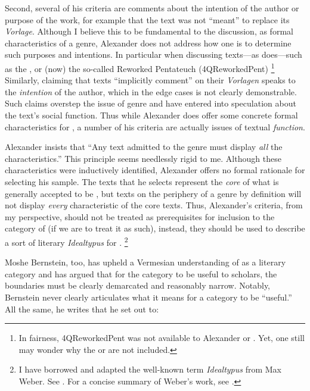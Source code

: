 Second, several of his criteria are comments about the intention of the author or purpose of the work, for example that the \rwb text was not ``meant'' to replace its \emph{Vorlage}. Although I believe this to be fundamental to the discussion, as formal characteristics of a genre, Alexander does not address how one is to determine such purposes and intentions.  In particular when discussing texts---as \vermes does---such as the \pTarg, or (now) the so-called Reworked Pentateuch (4QReworkedPent)%
    \footnote{In fairness, 4QReworkedPent was not available to Alexander or \vermes. Yet, one still may wonder why   the \lxx or \sampent are not included.}
Similarly, claiming that \rwb texts ``implicitly comment'' on their \emph{Vorlagen} speaks to the \emph{intention} of the author, which in the edge cases is not clearly demonstrable. Such claims overstep the issue of genre and have entered into speculation about the text's social function. Thus while Alexander does offer some concrete formal characteristics for \rwb, a number of his criteria are actually issues of textual \emph{function}.

Alexander insists that ``Any text admitted to the genre must display \emph{all} the characteristics.''%
    \autocite[119 n. 11]{alexander_carson-williamson1988}
This principle seems needlessly rigid to me. Although these characteristics were inductively identified,  Alexander offers no formal rationale for selecting his sample. The texts that he selects represent the \emph{core} of what is generally accepted to be \rwb, but texts on the periphery of a genre by definition will not display \emph{every} characteristic of the core texts. Thus, Alexander's criteria, from my perspective, should not be treated as prerequisites for inclusion to the category of \rwb (if we are to treat it as such), instead, they should be used to describe a sort of literary \emph{Idealtypus} for \rwb.%
    \footnote{I have borrowed and adapted the well-known term \emph{Idealtypus} from Max Weber. See 
        \cite{weber1978}. For a concise summary of Weber's work, see 
        \cite[12--16]{smith-riley2009}.}

Moshe Bernstein, too, has upheld a Vermesian understanding of \rwb as a literary category and has argued that for the category to be useful to scholars, the boundaries must be clearly demarcated and reasonably narrow.%
    \autocite{bernstein_textus2005}
Notably, Bernstein never clearly articulates what it means for a category to be ``useful.'' All the same, he writes that he set out to: 

